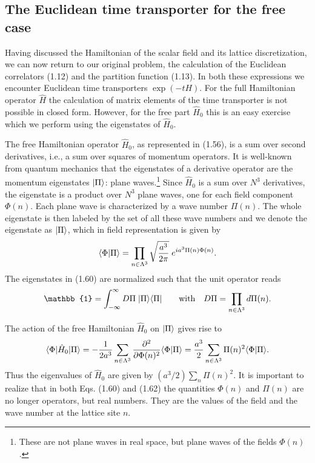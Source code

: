 \subsection{The Euclidean time transporter for the free case}

Having discussed the Hamiltonian of the scalar field and its lattice
discretization, we can now return to our original problem, the calculation of
the Euclidean correlators (1.12) and the partition function (1.13). In both
these expressions we encounter Euclidean time transporters $\exp(-tH)$. For the
full Hamiltonian operator $\hat{H}$ the calculation of matrix elements of the
time transporter is not possible in closed form. However, for the free part
$\hat{H}_0$ this is an easy exercise which we perform using the eigenstates of
$\hat{H}_0$.

The free Hamiltonian operator $\hat{H}_0$, as represented in (1.56), is a sum
over second derivatives, i.e., a sum over squares of momentum operators. It is
well-known from quantum mechanics that the eigenstates of a derivative operator
are the momentum eigenstates $|\Pi\rangle$: plane waves.\footnote{These are not
plane waves in real space, but plane waves of the fields $\Phi(n)$.} Since
$\hat{H}_0$ is a sum over $N^3$ derivatives, the eigenstate is a product over
$N^3$ plane waves, one for each field component $\Phi(n)$. Each plane wave is
characterized by a wave number $\Pi(n)$. The whole eigenstate is then labeled
by the set of all these wave numbers and we denote the eigenstate as
$|\Pi\rangle$, which in field representation is given by
\begin{equation}
  \langle\Phi|\Pi\rangle
  = \prod_{n\in\Lambda^3}\sqrt{\frac{a^3}{2\pi}}\;e^{i a^3\Pi(n)\Phi(n)}.
\end{equation}
The eigenstates in (1.60) are normalized such that the unit operator reads
\begin{equation}
  \mathbb{1} = \int_{-\infty}^{\infty}D\Pi\;\ket{\Pi}\bra{\Pi}
  \qquad \text{with} \quad D\Pi = \prod_{n\in\Lambda^3}d\Pi(n).
\end{equation}

The action of the free Hamiltonian $\hat{H}_0$ on $|\Pi\rangle$ gives rise to
\begin{equation}
  \langle\Phi|\hat{H}_0|\Pi\rangle
  = -\frac{1}{2a^3}\sum_{n\in\Lambda^3}
    \frac{\partial^2}{\partial\Phi(n)^2}\langle\Phi|\Pi\rangle
  = \frac{a^3}{2}\sum_{n\in\Lambda^3}\Pi(n)^2\langle\Phi|\Pi\rangle.
\end{equation}
Thus the eigenvalues of $\hat{H}_0$ are given by
$(a^3/2)\sum_n\Pi(n)^2$. It is important to realize that in both Eqs. (1.60)
and (1.62) the quantities $\Phi(n)$ and $\Pi(n)$ are no longer operators, but
real numbers. They are the values of the field and the wave number at the
lattice site $n$.

